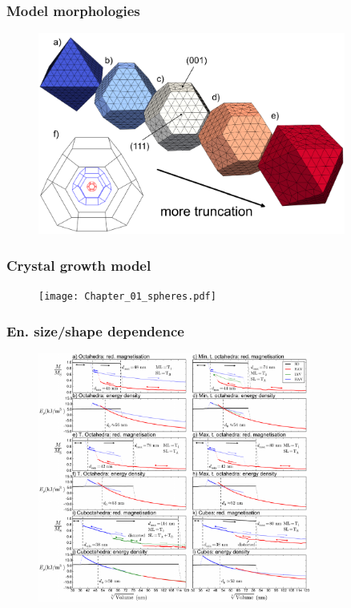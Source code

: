\documentclass{beamer}
\begin{document}
                \begin{frame}
                  \frametitle{Model morphologies}
                  \begin{figure}[htb]
                    \centering
                    \includegraphics[width=0.9\textwidth]{Chapter_01_Figure_01.pdf}
                  \end{figure}
                \end{frame}

                \begin{frame}
                  \frametitle{Crystal growth model}
                  \begin{figure}[htb]
                    \centering
                    \texttt{[image: Chapter\_01\_spheres.pdf]}
                  \end{figure}
                \end{frame}

                \begin{frame}
                  \frametitle{En. size/shape dependence}
                  \begin{figure}[htb]
                    \centering
                    \includegraphics[width=0.8\textwidth]{Chapter_01_Figure_03.pdf}
                  \end{figure}
                \end{frame}
\end{document}
